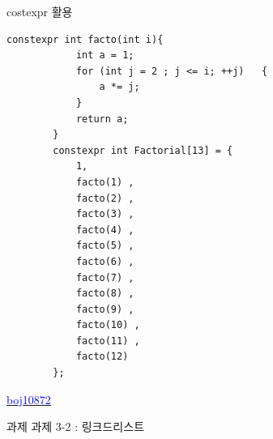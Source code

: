 \documentclass[10pt]{beamer}
\begin{document}
\begin{frame}[fragile]{costexpr 활용}
    \begin{lstlisting}[style = CppStyle]
        constexpr int facto(int i){
            int a = 1;
            for (int j = 2 ; j <= i; ++j)	{
                a *= j;
            }
            return a;
        }
        constexpr int Factorial[13] = {
            1,
            facto(1) ,
            facto(2) ,
            facto(3) ,
            facto(4) ,
            facto(5) ,
            facto(6) ,
            facto(7) ,
            facto(8) ,
            facto(9) ,
            facto(10) ,
            facto(11) ,
            facto(12)
        };
    \end{lstlisting}
    \href{https://www.acmicpc.net/problem/10872}{\textcolor{blue}{boj10872}}
    
\end{frame}


\begin{frame}{과제}
    과제 3-2 : 링크드리스트
\end{frame}    
\end{document}
